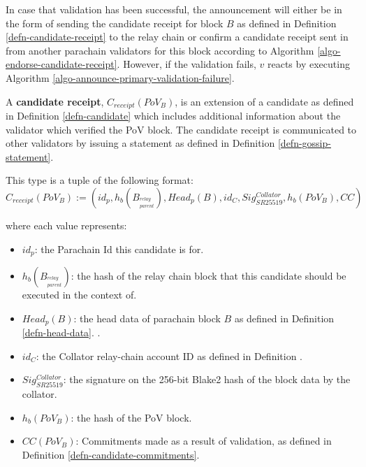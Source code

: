 In case that validation has been successful, the announcement will either be in
the form of sending the candidate receipt for block $B$ as defined in Definition
\ref{defn-candidate-receipt} to the relay chain or confirm a candidate receipt
sent in from another parachain validators for this block according to Algorithm
\ref{algo-endorse-candidate-receipt}. However, if the validation fails, $v$
reacts by executing Algorithm \ref{algo-announce-primary-validation-failure}.

\begin{definition}
  \label{defn-candidate-receipt}
  A \textbf{candidate receipt}, $C_{receipt}(PoV_B)$, is an extension of a candidate
  as defined in Definition \ref{defn-candidate} which includes additional
  information about the validator which verified the PoV block. The candidate
  receipt is communicated to other validators by issuing a statement as defined
  in Definition \ref{defn-gossip-statement}.
  \newline

  This type is a tuple of the following format:
  \[
  C_{receipt}(PoV_B) := (id_p, h_b({B_{^{relay}_{parent}}}), Head_p(B), id_{C}, Sig^{Collator}_{SR25519}, h_b({PoV_B}), CC)
  \]

  where each value represents:
  \begin{itemize}
    \item $id_p$: the Parachain Id this candidate is for.
    \item $h_b({B_{^{relay}_{parent}}})$: the hash of the relay chain block that this
    candidate should be executed in the context of.
    \item $Head_p(B)$: the head data of parachain block $B$ as defined in Definition \ref{defn-head-data}.
    .
    \item $id_C$: the Collator relay-chain account ID as defined in Definition
    .
    \item $Sig^{Collator}_{SR25519}$: the signature on the 256-bit Blake2 hash
    of the block data by the collator.
    \item $h_b({PoV_B})$: the hash of the PoV block.
    \item $CC(PoV_B)$: Commitments made as a result of validation, as defined in
    Definition \ref{defn-candidate-commitments}.
  \end{itemize}
\end{definition}

